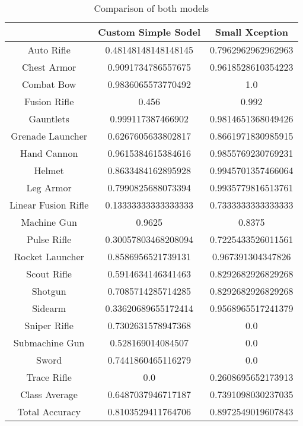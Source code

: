 \documentclass[11pt,a4paper]{article}
\begin{document}
\begin{table}[h]
  \caption{Comparison of both models}
  \label{table:results}
  \vspace{0.1in}
    \centering
    \begin{tabular}{c| c|c}
        \toprule
         & Custom Simple Sodel & Small Xception \\
         \midrule
            Auto Rifle & 0.48148148148148145 &
0.7962962962962963 \\
            Chest Armor & 0.9091734786557675 &
0.9618528610354223 \\
            Combat Bow & 0.9836065573770492 &
1.0 \\
            Fusion Rifle & 0.456 &
0.992 \\
            Gauntlets & 0.999117387466902 & 
0.9814651368049426 \\
            Grenade Launcher & 0.6267605633802817 &
0.8661971830985915 \\
            Hand Cannon & 0.9615384615384616 &
0.9855769230769231 \\
            Helmet& 0.8633484162895928 &
0.9945701357466064 \\ 
            Leg Armor & 0.7990825688073394 &
0.9935779816513761 \\
            Linear Fusion Rifle& 0.13333333333333333 &
0.7333333333333333 \\
            Machine Gun& 0.9625 &
0.8375 \\
            Pulse Rifle& 0.30057803468208094 &
0.7225433526011561 \\
            Rocket Launcher& 0.8586956521739131 &
0.967391304347826 \\
            Scout Rifle& 0.5914634146341463 &
0.8292682926829268 \\
            Shotgun& 0.7085714285714285 &
0.8292682926829268 \\
            Sidearm& 0.33620689655172414 &
0.9568965517241379 \\
            Sniper Rifle& 0.7302631578947368 &
0.0 \\
            Submachine Gun& 0.528169014084507 &
0.0 \\
            Sword& 0.7441860465116279 &
0.0 \\
            Trace Rifle& 0.0 &
0.2608695652173913 \\
            Class Average& 0.6487037946717187 &
0.7391098030237035 \\
            Total Accuracy& 0.8103529411764706 &
0.8972549019607843 \\
      \bottomrule
    \end{tabular}
\end{table}
\end{document}
